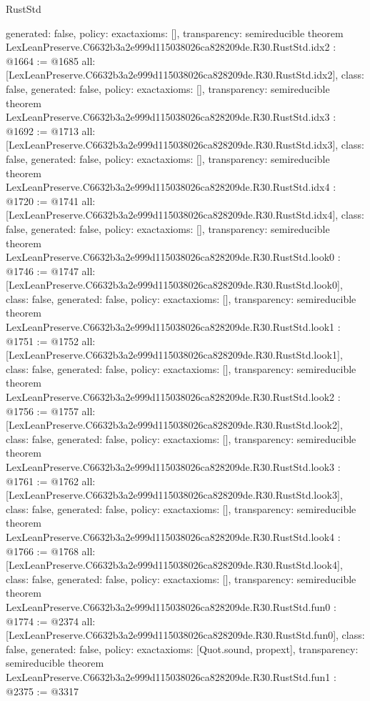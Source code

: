 \begin{lexlean}{RustStd}
\begin{coremodule}
{  generated: false,
  policy: exact{axioms: []},
  transparency: semireducible
}
theorem LexLeanPreserve.C6632b3a2e999d115038026ca828209de.R30.RustStd.idx2 : @1664 := @1685 {
  all: [LexLeanPreserve.C6632b3a2e999d115038026ca828209de.R30.RustStd.idx2],
  class: false,
  generated: false,
  policy: exact{axioms: []},
  transparency: semireducible
}
theorem LexLeanPreserve.C6632b3a2e999d115038026ca828209de.R30.RustStd.idx3 : @1692 := @1713 {
  all: [LexLeanPreserve.C6632b3a2e999d115038026ca828209de.R30.RustStd.idx3],
  class: false,
  generated: false,
  policy: exact{axioms: []},
  transparency: semireducible
}
theorem LexLeanPreserve.C6632b3a2e999d115038026ca828209de.R30.RustStd.idx4 : @1720 := @1741 {
  all: [LexLeanPreserve.C6632b3a2e999d115038026ca828209de.R30.RustStd.idx4],
  class: false,
  generated: false,
  policy: exact{axioms: []},
  transparency: semireducible
}
theorem LexLeanPreserve.C6632b3a2e999d115038026ca828209de.R30.RustStd.look0 : @1746 := @1747 {
  all: [LexLeanPreserve.C6632b3a2e999d115038026ca828209de.R30.RustStd.look0],
  class: false,
  generated: false,
  policy: exact{axioms: []},
  transparency: semireducible
}
theorem LexLeanPreserve.C6632b3a2e999d115038026ca828209de.R30.RustStd.look1 : @1751 := @1752 {
  all: [LexLeanPreserve.C6632b3a2e999d115038026ca828209de.R30.RustStd.look1],
  class: false,
  generated: false,
  policy: exact{axioms: []},
  transparency: semireducible
}
theorem LexLeanPreserve.C6632b3a2e999d115038026ca828209de.R30.RustStd.look2 : @1756 := @1757 {
  all: [LexLeanPreserve.C6632b3a2e999d115038026ca828209de.R30.RustStd.look2],
  class: false,
  generated: false,
  policy: exact{axioms: []},
  transparency: semireducible
}
theorem LexLeanPreserve.C6632b3a2e999d115038026ca828209de.R30.RustStd.look3 : @1761 := @1762 {
  all: [LexLeanPreserve.C6632b3a2e999d115038026ca828209de.R30.RustStd.look3],
  class: false,
  generated: false,
  policy: exact{axioms: []},
  transparency: semireducible
}
theorem LexLeanPreserve.C6632b3a2e999d115038026ca828209de.R30.RustStd.look4 : @1766 := @1768 {
  all: [LexLeanPreserve.C6632b3a2e999d115038026ca828209de.R30.RustStd.look4],
  class: false,
  generated: false,
  policy: exact{axioms: []},
  transparency: semireducible
}
theorem LexLeanPreserve.C6632b3a2e999d115038026ca828209de.R30.RustStd.fun0 : @1774 := @2374 {
  all: [LexLeanPreserve.C6632b3a2e999d115038026ca828209de.R30.RustStd.fun0],
  class: false,
  generated: false,
  policy: exact{axioms: [Quot.sound, propext]},
  transparency: semireducible
}
theorem LexLeanPreserve.C6632b3a2e999d115038026ca828209de.R30.RustStd.fun1 : @2375 := @3317 {
}
\end{coremodule}
\end{lexlean}
